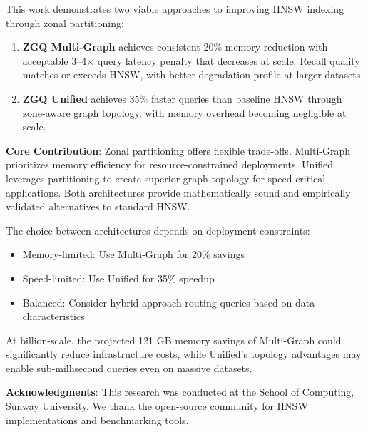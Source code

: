 \documentclass[11pt,a4paper]{article}
\begin{document}
This work demonstrates two viable approaches to improving HNSW indexing through zonal partitioning:

\begin{enumerate}
    \item \textbf{ZGQ Multi-Graph} achieves consistent 20\% memory reduction with acceptable 3--4× query latency penalty that decreases at scale. Recall quality matches or exceeds HNSW, with better degradation profile at larger datasets.
    
    \item \textbf{ZGQ Unified} achieves 35\% faster queries than baseline HNSW through zone-aware graph topology, with memory overhead becoming negligible at scale.
\end{enumerate}

\begin{keybox}
\textbf{Core Contribution}: Zonal partitioning offers flexible trade-offs. Multi-Graph prioritizes memory efficiency for resource-constrained deployments. Unified leverages partitioning to create superior graph topology for speed-critical applications. Both architectures provide mathematically sound and empirically validated alternatives to standard HNSW.
\end{keybox}

The choice between architectures depends on deployment constraints:
\begin{itemize}
    \item Memory-limited: Use Multi-Graph for 20\% savings
    \item Speed-limited: Use Unified for 35\% speedup
    \item Balanced: Consider hybrid approach routing queries based on data characteristics
\end{itemize}

At billion-scale, the projected 121 GB memory savings of Multi-Graph could significantly reduce infrastructure costs, while Unified's topology advantages may enable sub-millisecond queries even on massive datasets.

\vspace{1em}
\noindent\textbf{Acknowledgments}: This research was conducted at the School of Computing, Sunway University. We thank the open-source community for HNSW implementations and benchmarking tools.
\end{document}
